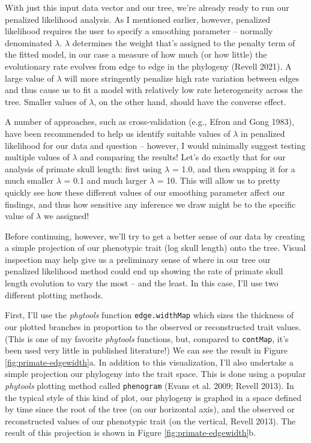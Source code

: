 \documentclass[fleqn,10pt,lineno]{wlpeerj} %
\begin{document}
With just this input data vector and our tree, we're already ready to run our penalized likelihood analysis. As I mentioned earlier, however, penalized likelihood requires the user to specify a smoothing parameter -- normally denominated \(\lambda\). \(\lambda\) determines the weight that's assigned to the penalty term of the fitted model, in our case a measure of how much (or how little) the evolutionary rate evolves from edge to edge in the phylogeny (Revell 2021). A large value of \(\lambda\) will more stringently penalize high rate variation between edges and thus cause us to fit a model with relatively low rate heterogeneity across the tree. Smaller values of \(\lambda\), on the other hand, should have the converse effect.

A number of approaches, such as cross-validation (e.g., Efron and Gong 1983), have been recommended to help us identify suitable values of \(\lambda\) in penalized likelihood for our data and question -- however, I would minimally suggest testing multiple values of \(\lambda\) and comparing the results! Let's do exactly that for our analysis of primate skull length: first using \(\lambda\) = 1.0, and then swapping it for a much smaller \(\lambda\) = 0.1 and much larger \(\lambda\) = 10. This will allow us to pretty quickly see how these different values of our smoothing parameter affect our findings, and thus how sensitive any inference we draw might be to the specific value of \(\lambda\) we assigned!

Before continuing, however, we'll try to get a better sense of our data by creating a simple projection of our phenotypic trait (log skull length) onto the tree. Visual inspection may help give us a preliminary sense of where in our tree our penalized likelihood method could end up showing the rate of primate skull length evolution to vary the most -- and the least. In this case, I'll use two different plotting methods.

First, I'll use the \emph{phytools} function \texttt{edge.widthMap} which sizes the thickness of our plotted branches in proportion to the observed or reconstructed trait values. (This is one of my favorite \emph{phytools} functions, but, compared to \texttt{contMap}, it's been used very little in published literature!) We can see the result in Figure \ref{fig:primate-edgewidth}a. In addition to this visualization, I'll also undertake a simple projection our phylogeny into the trait space. This is done using a popular \emph{phytools} plotting method called \texttt{phenogram} (Evans et al. 2009; Revell 2013). In the typical style of this kind of plot, our phylogeny is graphed in a space defined by time since the root of the tree (on our horizontal axis), and the observed or reconstructed values of our phenotypic trait (on the vertical, Revell 2013). The result of this projection is shown in Figure \ref{fig:primate-edgewidth}b.
\end{document}
